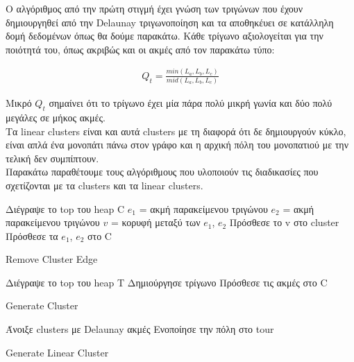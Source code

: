 \documentclass[oneside,12pt]{book}
\theoremstyle{definition}
\begin{document}
Ο αλγόριθμος από την πρώτη στιγμή έχει γνώση των τριγώνων που έχουν δημιουργηθεί από την Delaunay τριγωνοποίηση και τα αποθηκέυει σε κατάλληλη δομή δεδομένων όπως θα δούμε παρακάτω. Κάθε τρίγωνο αξιολογείται για την ποιότητά του, όπως ακριβώς και οι ακμές από τον παρακάτω τύπο:

\begin{align*}
	Q_{t} = \frac{min(L_a, L_b, L_c)}{mid(L_a, L_b, L_c)}
\end{align*}

Μικρό \(Q_t\) σημαίνει ότι το τρίγωνο έχει μία πάρα πολύ μικρή γωνία και δύο πολύ μεγάλες σε μήκος ακμές. \\

Τα linear clusters είναι και αυτά clusters με τη διαφορά ότι δε δημιουργούν κύκλο, είναι απλά ένα μονοπάτι πάνω στον γράφο και η αρχική πόλη του μονοπατιού με την τελική δεν συμπίπτουν. \\

Παρακάτω παραθέτουμε τους αλγόριθμους που υλοποιούν τις διαδικασίες που σχετίζονται με τα clusters και τα linear clusters. \\

\begin{algorithm}[H]
	\SetAlgoLined
	
	Διέγραψε το top του heap C \;
	\(e_1\) = ακμή παρακείμενου τριγώνου \;
	\(e_2\) = ακμή παρακείμενου τριγώνου \;	
	\(v\) = κορυφή μεταξύ των \(e_1\), \(e_2\) \;
	Πρόσθεσε το v στο cluster \;
	Πρόσθεσε τα \(e_1\), \(e_2\) στο C \;
	
	\caption{Remove Cluster Edge}
\end{algorithm}

\begin{algorithm}[H]
	\SetAlgoLined
	
	Διέγραψε το top του heap T \;
	Δημιούργησε τρίγωνο \;
	Πρόσθεσε τις ακμές στο C \;
	
	\caption{Generate Cluster}
\end{algorithm}

\begin{algorithm}[H]
	\SetAlgoLined
	
	{Άνοιξε clusters με Delaunay ακμές \;
	Ενοποίησε την πόλη στο tour \;}
	
	\caption{Generate Linear Cluster}
\end{algorithm}
\end{document}
